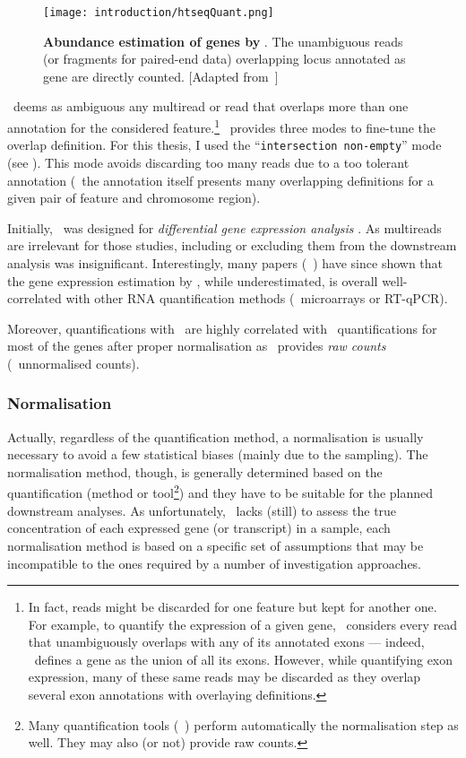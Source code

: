\begin{figure}
    \texttt{[image: introduction/htseqQuant.png]}\centering
    \caption[Abundance estimation of genes by
    HTSeq-count]{\label{fig:htseqEstimation}\textbf{Abundance estimation of genes
    by \htseq}. The unambiguous reads (or fragments for paired-end data)
    overlapping locus annotated as gene are directly counted. [Adapted
    from~\cite{MarPhD}]}
  \end{figure}

\htseq\ deems as ambiguous any multiread or read that overlaps more than
one annotation for the considered feature.\footnote{In fact, reads might be
discarded for one feature but kept for another one. For example, to quantify the
expression of a given gene, \htseq\ considers every read that unambiguously
overlaps with any of its annotated exons --- indeed, \htseq\ defines a gene
as the union of all its exons. However, while quantifying exon expression, many
of these same reads may be discarded as they overlap several exon annotations
with overlaying definitions.}
\htseq\ provides
three modes to fine-tune the overlap definition.
For this thesis, I used the \enquote{\texttt{intersection non-empty}} mode
(see ).
This mode avoids discarding too many reads due to a too tolerant annotation
(\ie\ the annotation itself presents many overlapping definitions for a given
pair of feature and chromosome region).

Initially, \htseq\ was designed for \emph{differential gene
expression analysis} . As multireads are irrelevant for
those studies, including or excluding them from the downstream analysis was
insignificant. Interestingly, many papers
(\eg~)
have since shown that
the gene expression estimation by \htseq, while underestimated, is overall
well-correlated with other \gls{RNA} quantification methods
(\eg\ microarrays or \gls{RT-qPCR}).

Moreover, quantifications with \htseq\ are highly correlated with \cuffl\
quantifications for most of the genes after proper normalisation
\mycite{tophatStarwhatever} as \htseq\ provides \emph{raw counts} (\ie\
unnormalised counts).


\subsubsection{Normalisation}\label{subsub:norm}
Actually, regardless of the quantification method, a normalisation is usually
necessary to avoid a few statistical biases (mainly due to the sampling). The
normalisation method, though, is generally determined based on the quantification
(method or tool\footnote{Many quantification tools (\eg\ \cuffl) perform
automatically the normalisation step as well. They may also (or not) provide
raw counts.}) and they have to be suitable for the planned downstream analyses.
As unfortunately, \Rnaseq\ lacks (still) to assess the true concentration of each
expressed gene (or transcript) in a sample, each normalisation method is based on
a specific set of assumptions that may be incompatible to the ones required by
a number of investigation approaches.

